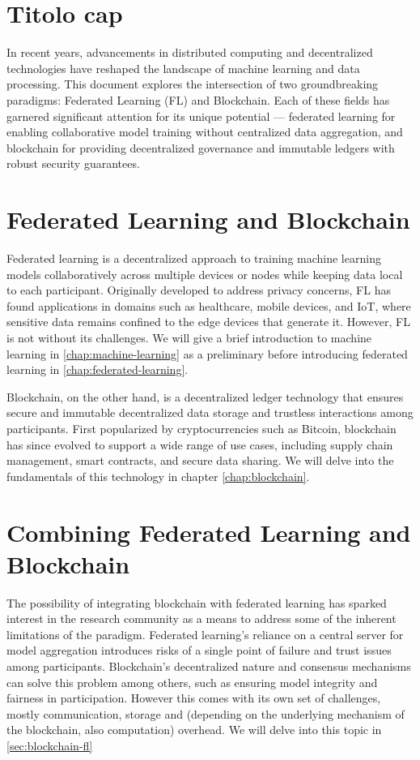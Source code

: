 \section*{Titolo cap}\label{chap:introduction}

In recent years, advancements in distributed computing and decentralized technologies have reshaped the
landscape of machine learning and data processing. This document explores the intersection of two
groundbreaking paradigms: Federated Learning (FL) and Blockchain. Each of these fields has garnered
significant attention for its unique potential — federated learning for enabling collaborative model training
without centralized data aggregation, and blockchain for providing decentralized governance and immutable ledgers
with robust security guarantees.

\section{Federated Learning and Blockchain}

Federated learning is a decentralized approach to training machine learning models collaboratively across
multiple devices or nodes while keeping data local to each participant. Originally developed to address
privacy concerns, FL has found applications in domains such as healthcare, mobile devices, and IoT, where
sensitive data remains confined to the edge devices that generate it. However, FL is not without its
challenges. We will give a brief introduction to machine learning in \ref{chap:machine-learning}
as a preliminary before introducing federated learning in \ref{chap:federated-learning}.

Blockchain, on the other hand, is a decentralized ledger technology that ensures secure and immutable
decentralized data storage and trustless interactions among participants.
First popularized by cryptocurrencies such as Bitcoin, blockchain has since evolved to support a wide range
of use cases, including supply chain management, smart
contracts, and secure data sharing. We will delve into the fundamentals of this technology in chapter \ref{chap:blockchain}.

\section{Combining Federated Learning and Blockchain}

The possibility of integrating blockchain with federated learning has sparked interest in the research community as a
means to address some of the inherent limitations of the paradigm.
Federated learning's reliance on a central server for model aggregation introduces risks of a single point of failure
and trust issues among participants.
Blockchain's decentralized nature and consensus mechanisms can solve this problem among others, such as
ensuring model integrity and fairness in participation. However this comes with its own set of challenges,
mostly communication, storage and (depending on the underlying mechanism of the blockchain, also computation) overhead.
We will delve into this topic in \ref{sec:blockchain-fl}

